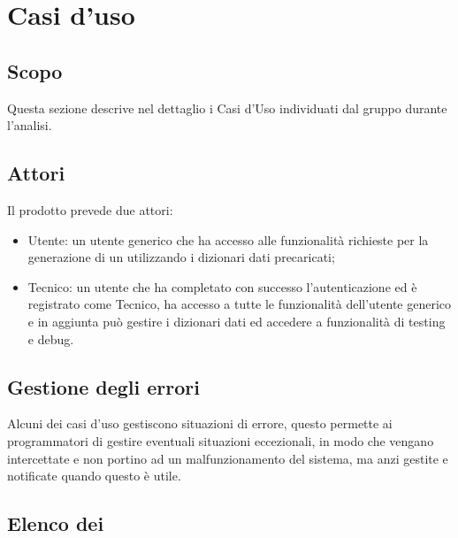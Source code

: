 \section{Casi d'uso}

\subsection{Scopo}
Questa sezione descrive nel dettaglio i Casi d’Uso individuati dal gruppo durante l'analisi.

\subsection{Attori}
Il prodotto prevede due attori:
\begin{itemize}
  \item Utente: un utente generico che ha accesso alle funzionalità richieste per la generazione di un  utilizzando i dizionari dati precaricati;
  \item Tecnico: un utente che ha completato con successo l'autenticazione ed è registrato come Tecnico, ha accesso a tutte le funzionalità dell'utente generico e in aggiunta può gestire i dizionari dati ed accedere a funzionalità di testing e debug.
\end{itemize}

\subsection{Gestione degli errori}
Alcuni dei casi d'uso gestiscono situazioni di errore, questo permette ai programmatori di gestire eventuali situazioni eccezionali, in modo che vengano intercettate e non portino ad un malfunzionamento del sistema, ma anzi gestite e notificate quando questo è utile.

\subsection{Elenco dei }


























